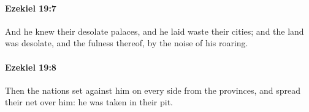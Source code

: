 		\paragraph{Ezekiel 19:7} %
			\label{EZEKIEL-19-7}

			And he knew their desolate palaces, and he laid waste their cities; and the land was desolate, and the fulness thereof, by the noise of his roaring.


		\paragraph{Ezekiel 19:8} %
			\label{EZEKIEL-19-8}

			Then the nations set against him on every side from the provinces, and spread their net over him: he was taken in their pit.


